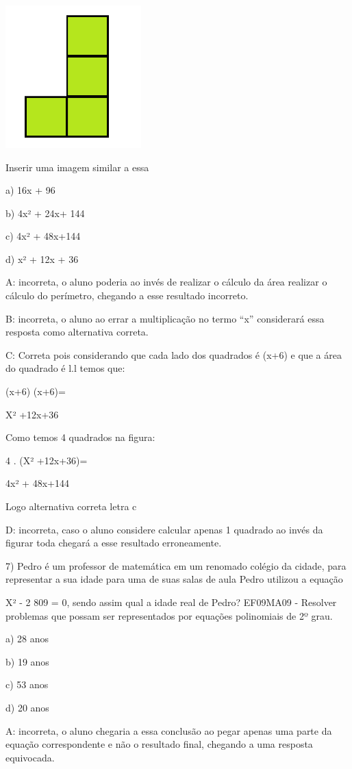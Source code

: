 \includegraphics[width=2.05833in,height=2.16573in]{./imgSAEB_8_MAT/media/image57.png}

Inserir uma imagem similar a essa

a) 16x + 96

b) 4x² + 24x+ 144

c) 4x² + 48x+144

d) x² + 12x + 36

A: incorreta, o aluno poderia ao invés de realizar o cálculo da área
realizar o cálculo do perímetro, chegando a esse resultado incorreto.

B: incorreta, o aluno ao errar a multiplicação no termo ``x''
considerará essa resposta como alternativa correta.

C: Correta pois considerando que cada lado dos quadrados é (x+6) e que a
área do quadrado é l.l temos que:

(x+6) (x+6)=

X² +12x+36

Como temos 4 quadrados na figura:

4 . (X² +12x+36)=

4x² + 48x+144

Logo alternativa correta letra c

D: incorreta, caso o aluno considere calcular apenas 1 quadrado ao invés
da figurar toda chegará a esse resultado erroneamente.

7) Pedro é um professor de matemática em um renomado colégio da cidade,
para representar a sua idade para uma de suas salas de aula Pedro
utilizou a equação

X² - 2 809 = 0, sendo assim qual a idade real de Pedro? EF09MA09 -
Resolver problemas que possam ser representados por equações polinomiais
de 2º grau.

a) 28 anos

b) 19 anos

c) 53 anos

d) 20 anos

A: incorreta, o aluno chegaria a essa conclusão ao pegar apenas uma
parte da equação correspondente e não o resultado final, chegando a uma
resposta equivocada.

